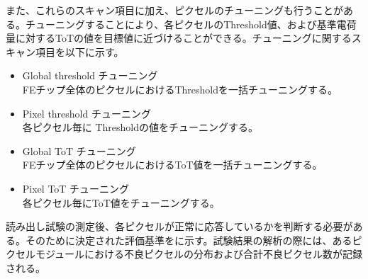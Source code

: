 また、これらのスキャン項目に加え、ピクセルのチューニングも行うことがある。チューニングすることにより、各ピクセルのThreshold値、および基準電荷量に対するToTの値を目標値に近づけることができる。チューニングに関するスキャン項目を以下に示す。
\begin{itemize}
  \item Global threshold チューニング \\
  FEチップ全体のピクセルにおけるThresholdを一括チューニングする。
  \item Pixel threshold チューニング\\
  各ピクセル毎に Thresholdの値をチューニングする。
  \item Global ToT チューニング \\
  FEチップ全体のピクセルにおけるToT値を一括チューニングする。
  \item Pixel ToT チューニング \\
  各ピクセル毎にToT値をチューニングする。
\end{itemize}

読み出し試験の測定後、各ピクセルが正常に応答しているかを判断する必要がある。そのために決定された評価基準をに示す。試験結果の解析の際には、あるピクセルモジュールにおける不良ピクセルの分布および合計不良ピクセル数が記録される。



